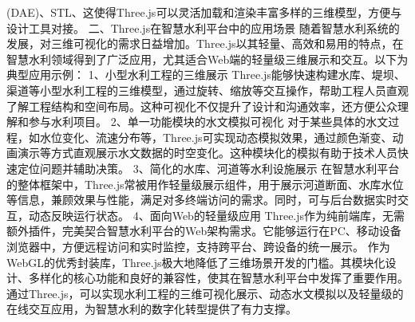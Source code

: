 {(DAE)、STL、这使得Three.js可以灵活加载和渲染丰富多样的三维模型，方便与设计工具对接。 二、Three.js在智慧水利平台中的应用场景
随着智慧水利系统的发展，对三维可视化的需求日益增加。Three.js以其轻量、高效和易用的特点，在智慧水利领域得到了广泛应用，尤其适合Web端的轻量级三维展示和交互。以下为典型应用示例： 1、小型水利工程的三维展示
Three.js能够快速构建水库、堤坝、渠道等小型水利工程的三维模型，通过旋转、缩放等交互操作，帮助工程人员直观了解工程结构和空间布局。这种可视化不仅提升了设计和沟通效率，还方便公众理解和参与水利项目。 2、单一功能模块的水文模拟可视化
对于某些具体的水文过程，如水位变化、流速分布等，Three.js可实现动态模拟效果，通过颜色渐变、动画演示等方式直观展示水文数据的时空变化。这种模块化的模拟有助于技术人员快速定位问题并辅助决策。 3、简化的水库、河道等水利设施展示
在智慧水利平台的整体框架中，Three.js常被用作轻量级展示组件，用于展示河道断面、水库水位等信息，兼顾效果与性能，满足对多终端访问的需求。同时，可与后台数据实时交互，动态反映运行状态。 4、面向Web的轻量级应用
Three.js作为纯前端库，无需额外插件，完美契合智慧水利平台的Web架构需求。它能够运行在PC、移动设备浏览器中，方便远程访问和实时监控，支持跨平台、跨设备的统一展示。
作为WebGL的优秀封装库，Three.js极大地降低了三维场景开发的门槛。其模块化设计、多样化的核心功能和良好的兼容性，使其在智慧水利平台中发挥了重要作用。通过Three.js，可以实现水利工程的三维可视化展示、动态水文模拟以及轻量级的在线交互应用，为智慧水利的数字化转型提供了有力支撑。
}

